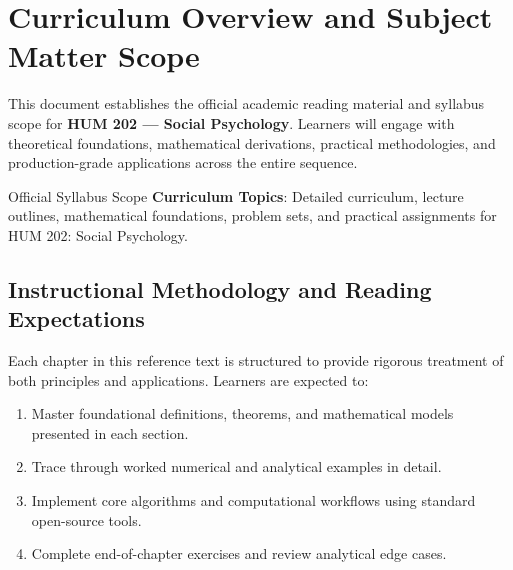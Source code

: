 \section{Curriculum Overview and Subject Matter Scope}

This document establishes the official academic reading material and syllabus scope for \textbf{HUM 202 --- Social Psychology}. Learners will engage with theoretical foundations, mathematical derivations, practical methodologies, and production-grade applications across the entire sequence.

\begin{InsightBox}{Official Syllabus Scope}
  \textbf{Curriculum Topics}: Detailed curriculum, lecture outlines, mathematical foundations, problem sets, and practical assignments for HUM 202: Social Psychology.
\end{InsightBox}

\subsection{Instructional Methodology and Reading Expectations}

Each chapter in this reference text is structured to provide rigorous treatment of both principles and applications. Learners are expected to:
\begin{enumerate}
  \item Master foundational definitions, theorems, and mathematical models presented in each section.
  \item Trace through worked numerical and analytical examples in detail.
  \item Implement core algorithms and computational workflows using standard open-source tools.
  \item Complete end-of-chapter exercises and review analytical edge cases.
\end{enumerate}

